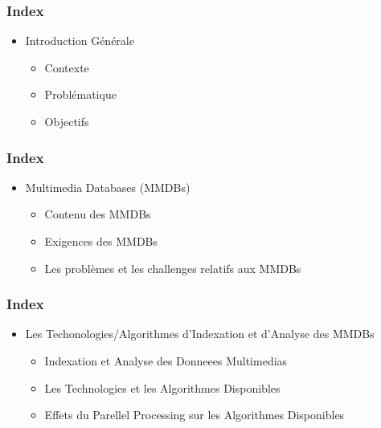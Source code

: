 \begin{frame}[plain]
		\begin{block}{}
		\frametitle{\caasifont Index}
			\begin{itemize}
				\item Introduction Générale \vspace{1.5em}
					\begin{itemize} \vspace{1.5em}
					\item Contexte \vspace{1.5em}
					\item Problématique \vspace{1.5em}
					\item Objectifs \vspace{1.5em}
					\end{itemize}
			\end{itemize}
		\end{block}
\end{frame}

\begin{frame}[plain]
		\begin{block}{}
		\frametitle{\caasifont Index}
			\begin{itemize}
				\item Multimedia Databases (MMDBs) \vspace{1.5em}
					\begin{itemize}
						\item Contenu des MMDBs \vspace{1.5em}
						\item Exigences des MMDBs \vspace{1.5em}
						\item Les problèmes et les challenges relatifs aux MMDBs \vspace{1.5em}
					\end{itemize}
			\end{itemize}
		\end{block}
\end{frame}
	

\begin{frame}[plain]
		\begin{block}{}
		\frametitle{\caasifont Index}
			\begin{itemize}
				\item Les Techonologies/Algorithmes d’Indexation et d’Analyse des MMDBs \vspace{1.5em}
				\begin{itemize}
					\item Indexation et Analyse des Donneees Multimedias \vspace{1.5em}
					\item Les Technologies et les Algorithmes Disponibles \vspace{1.5em}
					\item Effets du Parellel Processing sur les Algorithmes Disponibles \vspace{1.5em}			
				\end{itemize}
			\end{itemize}
		\end{block}
\end{frame}
	


